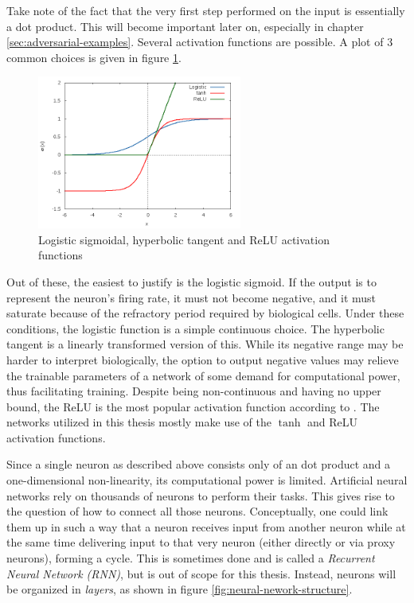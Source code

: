 \documentclass[11pt, a4paper]{article}
\begin{document}
Take note of the fact that the very first step performed on the input is essentially a dot product. This will become important later on, especially in chapter \ref{sec:adversarial-examples}. Several activation functions are possible. A plot of 3 common choices is given in figure \ref{fig:activation-functions}.

\begin{figure}[h!tb]
	\centering
	\includegraphics[width=0.6\textwidth]{images/activation_functions.png}
	\caption[Activation functions]{Logistic sigmoidal, hyperbolic tangent and ReLU activation functions}
	\label{fig:activation-functions}
\end{figure}

Out of these, the easiest to justify is the logistic sigmoid. If the output is to represent the neuron's firing rate, it must not become negative, and it must saturate because of the refractory period required by biological cells. Under these conditions, the logistic function is a simple continuous choice. The hyperbolic tangent is a linearly transformed version of this. While its negative range may be harder to interpret biologically, the option to output negative values may relieve the trainable parameters of a network of some demand for computational power, thus facilitating training. Despite being non-continuous and having no upper bound, the ReLU is the most popular activation function according to \cite{deep-learning}. The networks utilized in this thesis mostly make use of the $\tanh$ and ReLU activation functions.

Since a single neuron as described above consists only of an dot product and a one-dimensional non-linearity, its computational power is limited. Artificial neural networks rely on thousands of neurons to perform their tasks. This gives rise to the question of how to connect all those neurons. Conceptually, one could link them up in such a way that a neuron receives input from another neuron while at the same time delivering input to that very neuron (either directly or via proxy neurons), forming a cycle. This is sometimes done and is called a \emph{Recurrent Neural Network (RNN)}, but is out of scope for this thesis. Instead, neurons will be organized in \emph{layers}, as shown in figure \ref{fig:neural-nework-structure}.
\end{document}
